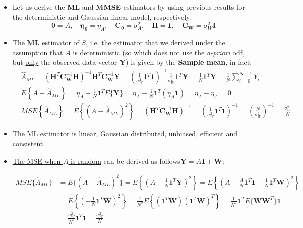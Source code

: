 \begin{itemize}
\item Let us derive the \textbf{ML} and \textbf{MMSE} estimators by using previous results for the deterministic and Gaussian linear model, respectively:
$$\boldsymbol{\theta} = A, \quad \boldsymbol{\eta}_{\boldsymbol{\theta}} = \eta_{A}, \quad \mathbf{C}_{\boldsymbol{\theta}} = \sigma_{A}^{2}, \quad \mathbf{H} = \mathbf{1}, \quad \mathbf{C}_{\mathbf{W}} = \sigma_{W}^{2} \mathbf{I}$$
\item The \textbf{ML} estimator of \(S\), i.e. the estimator that we derived under the assumption that \(A\) is deterministic (so which does not use the \textit{a-priori} odf, but \underline{only} the observed data vector \textbf{Y}) is given by the \textbf{Sample mean}, in fact:
\begin{align*}
&\hat{A}_{ML} = \left(\mathbf{H}^{T} \mathbf{C}_{\mathbf{W}}^{-1} \mathbf{H}\right)^{-1} \mathbf{H}^{T} \mathbf{C}_{\mathbf{W}}^{-1} \mathbf{Y} = \left(\frac{1}{\sigma_{W}^{2}} \mathbf{1}^{T} \mathbf{1}\right)^{-1} \frac{1}{\sigma_{W}^{2}} \mathbf{1}^{T} \mathbf{Y} = \frac{1}{N} \mathbf{1}^{T} \mathbf{Y} = \frac{1}{N} \sum_{i=0}^{N-1} Y_{i} \\[1em]
&E\left\{A - \hat{A}_{ML}\right\} = \eta_{A} - \frac{1}{N} \mathbf{1}^{T} E\{\mathbf{Y}\} = \eta_{A} - \frac{1}{N} \mathbf{1}^{T} (\eta_{A}\mathbf{1}) = \eta_{A} - \eta_{A} = 0 \\[1em]
&MSE\left\{\hat{A}_{ML}\right\} = E\left\{(A - \hat{A}_{ML})^{2}\right\} = \left(\mathbf{H}^{T} \mathbf{C}_{\mathbf{W}}^{-1} \mathbf{H}\right)^{-1} = \left(\frac{1}{\sigma_{W}^{2}} \mathbf{1}^{T} \mathbf{1}\right)^{-1} = \left(\frac{N}{\sigma_{W}^{2}}\right)^{-1} = \frac{\sigma_{W}^{2}}{N}
\end{align*}
\item The ML estimator is linear, Gaussian distributed, unbiased, efficient and consistent.

\item \underline{The MSE when \(A\) is random} can be derived as follows\(\mathbf{Y}=A\mathbf{1}+\mathbf{W}\):

\begin{align*}
MSE\{\hat{A}_{ML}\} &= E\{(A - \hat{A}_{ML})^{2}\} = E\left\{\left(A - \frac{1}{N} \mathbf{1}^{T} \mathbf{Y}\right)^{2}\right\} = E\left\{\left(A - \frac{A}{N} \mathbf{1}^{T} \mathbf{1} - \frac{1}{N} \mathbf{1}^{T} \mathbf{W}\right)^{2}\right\} \\
&= E\left\{\left(-\frac{1}{N} \mathbf{1}^{T} \mathbf{W}\right)^{2}\right\} = \frac{1}{N^{2}} E\left\{(\mathbf{1}^{T} \mathbf{W})(\mathbf{1}^{T} \mathbf{W})^{T}\right\} = \frac{1}{N^{2}} \mathbf{1}^{T} E\{\mathbf{W}\mathbf{W}^{T}\}\mathbf{1} \\
&= \frac{\sigma_{W}^{2}}{N^{2}} \mathbf{1}^{T} \mathbf{1} = \frac{\sigma_{W}^{2}}{N}
\end{align*}


\end{itemize}
